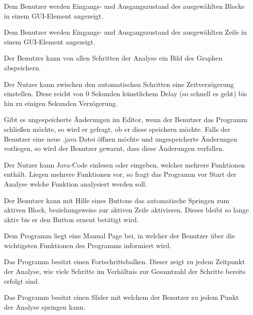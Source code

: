 Dem Benutzer werden Eingangs- und Ausgangszustand des ausgewählten Blocks in einem GUI-Element angezeigt.

Dem Benutzer werden Eingangs- und Ausgangszustand der ausgewählten Zeile in einem GUI-Element angezeigt.

Der Benutzer kann von allen Schritten der Analyse ein Bild des Graphen abspeichern.

Der Nutzer kann zwischen den automatischen Schritten eine Zeitverzögerung einstellen. Diese reicht von 0 Sekunden künstlichem Delay (so schnell es geht) bis hin zu einigen Sekunden Verzögerung.

Gibt es ungespeicherte Änderungen im Editor, wenn der Benutzer das Programm schließen möchte, so wird er gefragt, ob er diese speichern möchte.
Falls der Benutzer eine neue .java Datei öffnen möchte und ungespeicherte Änderungen vorliegen, so wird der Benutzer gewarnt, dass diese Änderungen verfallen.

Der Nutzer kann Java-Code einlesen oder eingeben, welcher mehrere Funktionen
enthält. Liegen mehrere Funktionen vor, so fragt das Programm vor Start der Analyse welche Funktion analysiert werden soll.

Der Benutzer kann mit Hilfe eines Buttons das automatische Springen zum aktiven Block, beziehungsweise zur aktiven Zeile aktivieren. Dieses bleibt so lange aktiv bis er den Button erneut betätigt wird.

Dem Programm liegt eine Manual Page bei, in welcher der Benutzer über die wichtigsten Funktionen des Programms informiert wird.

Das Programm besitzt einen Fortschrittsbalken. Dieser zeigt zu jedem Zeitpunkt der Analyse, wie viele Schritte im Verhältnis zur Gesamtzahl der Schritte bereits erfolgt sind.

Das Programm besitzt einen Slider mit welchem der Benutzer zu jedem Punkt der Analyse springen kann.